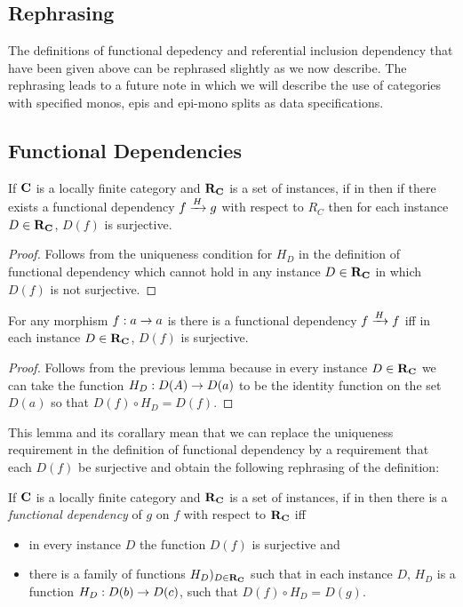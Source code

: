 \documentclass[10pt,a4paper]{article}
\theoremstyle{remark}
\renewcommand{\term}[1]{\textit{#1}}  %
\begin{document}
\begin{newtt}
\section{Rephrasing}
The definitions of functional depedency and referential inclusion dependency that have been given above 
can be rephrased slightly as we now describe. The rephrasing leads to a future note in which we will describe the use of categories with specified monos, epis and epi-mono splits as data specifications.
\subsection{Functional Dependencies}
\begin{lemma}
If $\catc$ is a locally finite category and $\reqtc$ is a set of instances, if \fgsourcediag in \catcw
then if there exists a functional dependency $\fundep{H}{f}{g}$  with respect to $R_C$ then
for each instance  $D \in \reqtc$, $D(f)$ is surjective.
\end{lemma}
\begin{proof}
Follows from the uniqueness condition for $H_D$ in the definition of functional dependency which cannot hold in any instance $D \in \reqtc$ in which $D(f)$ is not surjective.
\end{proof}
\begin{corollary}
For any morphism $f:a \morph a$ is \catcw there is a functional dependency $\fundep{H}{f}{f}$ iff
in each instance  $D \in \reqtc$, $D(f)$ is surjective.
\end{corollary}
\begin{proof}
Follows from the previous lemma because in every instance $D \in \reqtc$ 
we can take the function $H_D: D(A) \morph D(a)$ to be the identity function on the set $D(a)$
so that  $D(f) \circ H_D = D(f)$. 
\end{proof}
This lemma and its corallary  mean that we can replace the uniqueness requirement in the 
definition of functional dependency by a requirement that each $D(f)$ be surjective and obtain the following
rephrasing of the definition:
\begin{definition}
If $\catc$ is a locally finite category and $\reqtc$ is a set of instances, if \fgsourcediag in \catcw
then there is a  \term{functional dependency} of $g$ on $f$ with respect to $\reqtc$ iff
\begin{itemize}
\item in every instance $D$ the function $D(f)$ is surjective and
\item
there is a family of functions $H_D)_{D \in \reqtc}$ such that 
in each instance $D$, $H_D$ is a  function $H_D: D(b) \morph D(c)$, 
such that $D(f) \circ H_D = D(g)$. 
\end{itemize}
\end{definition}

\end{newtt}
\end{document}
